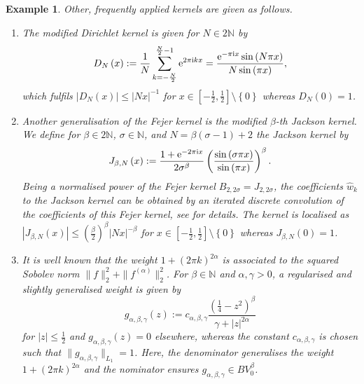 \documentclass[11pt,a4paper,bibtotoc]{scrartcl}
\def\N{\mathbb{N}}
\def\ti{\mbox{\scriptsize{\rm i}}}
\newcommand{\eimp}[1]{{\rm e}^{- \pi{\ti} #1}}
\newcommand{\eip}[1]{{\rm e}^{ 2\pi{\ti} #1}}
\newcommand{\eim}[1]{{\rm e}^{-2\pi{\ti} #1}}
\newtheorem{example}[theorem]{Example}
\newenvironment{Example}{\goodbreak \begin{example}\rm}{\end{example}}
\numberwithin{equation}{section}
\numberwithin{table}{section}
\numberwithin{figure}{section}
\begin{document}
\begin{Example}\label{ex:kernels}
Other, frequently applied kernels are given as follows.
\begin{enumerate}
\item
  The modified {\em Dirichlet kernel} is given for $N\in 2\N$ by
  \begin{equation*} \label{eq:dirichlet}
    D_N\left(x\right):=\frac{1}{N}\sum\limits_{k=-\frac{N}{2}}^{\frac{N}{2}-1}
    \eip{kx}= \frac{\eimp{x} \sin\left(N\pi x\right)}{N\sin\left(\pi x\right)},
  \end{equation*}
  which fulfils $|D_N(x)|\le |Nx|^{-1}$ for
  $x\in\left[-\frac{1}{2},\frac{1}{2}\right] \setminus\left\{0\right\}$
  whereas $D_N(0)=1$.
\item
  Another generalisation of the Fejer kernel is the modified $\beta$-th
  {\em Jackson kernel}.
  We define for $\beta\in2\N$, $\sigma\in \N$, and $N=\beta(\sigma-1)+2$ the
  Jackson kernel by
  \begin{equation}\label{eq:jackson}
    J_{\beta,N}\left(x\right):=\frac{1+\eim{x}}{2\sigma^{\beta}}
    \left(\frac{\sin\left(\sigma\pi x\right)}{\sin 
        \left(\pi x\right)}\right)^{\beta}.
  \end{equation}
  Being a normalised power of the Fejer kernel $B_{2,2\sigma}=J_{2,2\sigma}$,
  the coefficients $\hat w_k$ to the Jackson kernel can be obtained by an
  iterated discrete convolution of the coefficients of this Fejer kernel, see
  \cite{Alekseev} for details.
  The kernel is localised as $|J_{\beta,N}(x)| \le (\frac{\beta}{2})^{\beta}
  |Nx|^{-\beta}$ for $x\in\left[-\frac{1}{2},\frac{1}{2}\right]
  \setminus\left\{0\right\}$ whereas $J_{\beta,N}\left(0\right)=1$.
\item
  It is well known that the weight $1+(2\pi k)^{2\alpha}$ is associated to the
  squared Sobolev norm $\|f\|_2^2+\|f^{(\alpha)}\|_2^2$.
  For $\beta\in\N$ and $\alpha,\gamma>0$, a regularised and slightly
  generalised weight is given by
  \begin{equation*}
    g_{\alpha,\beta,\gamma}\left(z\right):=c_{\alpha,\beta,\gamma}
    \frac{\left(\frac{1}{4}-z^2\right)^{\beta}}{\gamma+|z|^{2\alpha}}
  \end{equation*}
  for $|z|\le\frac{1}{2}$ and $g_{\alpha,\beta,\gamma}(z)=0$
  elsewhere, whereas the constant $c_{\alpha,\beta,\gamma}$ is chosen such
  that $\|g_{\alpha,\beta,\gamma}\|_{L_1}=1$.
  Here, the denominator generalises the weight $1+(2\pi k)^{2\alpha}$ and the
  nominator ensures $g_{\alpha,\beta,\gamma} \in BV^{\beta}_0$.

\end{enumerate}
\end{Example}
\end{document}
